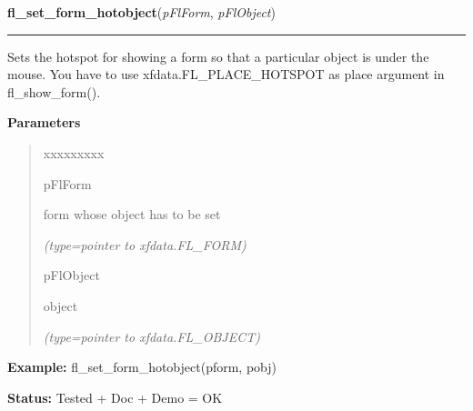     \label{xformslib:flbasic:fl_set_form_hotobject}

    \vspace{0.5ex}

\hspace{.8\funcindent}\begin{boxedminipage}{\funcwidth}

    \raggedright \textbf{fl\_set\_form\_hotobject}(\textit{pFlForm}, \textit{pFlObject})

    \vspace{-1.5ex}

    \rule{\textwidth}{0.5\fboxrule}
\setlength{\parskip}{2ex}
    Sets the hotspot for showing a form so that a particular object is 
    under the mouse. You have to use xfdata.FL\_PLACE\_HOTSPOT as place 
    argument in fl\_show\_form().

\setlength{\parskip}{1ex}
      \textbf{Parameters}
      \vspace{-1ex}

      \begin{quote}
        \begin{Ventry}{xxxxxxxxx}

          \item[pFlForm]

          form whose object has to be set

            {\it (type=pointer to xfdata.FL\_FORM)}

          \item[pFlObject]

          object

            {\it (type=pointer to xfdata.FL\_OBJECT)}

        \end{Ventry}

      \end{quote}

\textbf{Example:} fl\_set\_form\_hotobject(pform, pobj)



\textbf{Status:} Tested + Doc + Demo = OK



    \end{boxedminipage}

    \label{xformslib:flbasic:fl_set_form_minsize}

